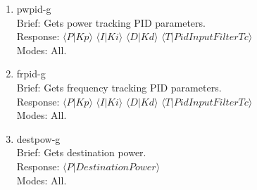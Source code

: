 \documentclass{article}
\begin{document}
\begin{enumerate}
      \item pwpid-g
            \\ Brief: Gets power tracking PID parameters.      
            \\Response: $\langle P|Kp \rangle$ $\langle I|Ki \rangle$ $\langle D|Kd \rangle$
            $\langle T|PidInputFilterTc \rangle$
            \\ Modes: All.
      \item frpid-g
            \\ Brief: Gets frequency tracking PID parameters.
            \\Response: $\langle P|Kp \rangle$ $\langle I|Ki \rangle$ $\langle D|Kd \rangle$
            $\langle T|PidInputFilterTc \rangle$
            \\ Modes: All.
      \item destpow-g
            \\ Brief: Gets destination power.
            \\ Response: $\langle P|DestinationPower \rangle$
            \\ Modes: All.
\end{enumerate}

\newpage
\end{document}
